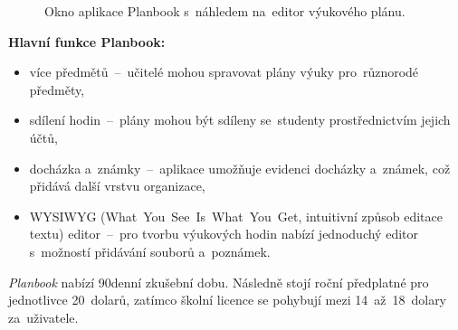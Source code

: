 \documentclass[male,czech,api_bc]{kitheses}
\begin{document}
\begin{figure}[H]
	\centering
	\caption{Okno aplikace Planbook s~náhledem na~editor výukového plánu.}
	\label{fig:planbook-2}
\end{figure}

\textbf{Hlavní funkce Planbook:}
\begin{itemize}
	\item více předmětů~--~učitelé mohou spravovat plány výuky pro~různorodé předměty,
	\item sdílení hodin~--~plány mohou být sdíleny se~studenty prostřednictvím jejich účtů,
	\item docházka a~známky~--~aplikace umožňuje evidenci docházky a~známek, což přidává další vrstvu organizace,
	\item WYSIWYG (What~You~See~Is~What~You~Get, intuitivní způsob editace textu) editor~--~pro tvorbu výukových hodin nabízí jednoduchý editor s~možností přidávání souborů a~poznámek.
\end{itemize}

\textit{Planbook} nabízí 90denní zkušební dobu. Následně stojí roční předplatné pro jednotlivce 20~dolarů, zatímco školní licence se pohybují mezi 14~až~18~dolary za~uživatele.
\end{document}
